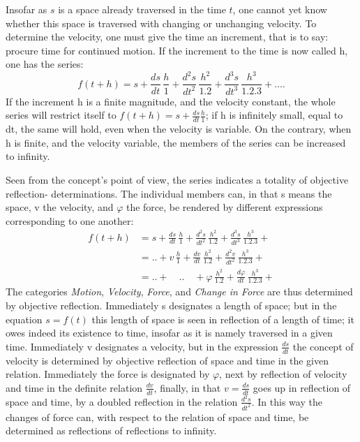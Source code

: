 \documentclass[12pt]{book}
\begin{document}
Insofar as $s$ is a space already traversed in the time $t$, one cannot yet know whether this space is
traversed with changing or unchanging velocity. To determine the velocity, one must give the time an
increment, that
is to say: procure time for continued motion. If the increment to the time is now called h, one has the
series:
\[ f(t+h) = s + \frac{ds}{dt}\,\frac{h}{1} + \frac{d^2 s}{dt^2}\,\frac{h^2}{1.2}
+ \frac{d^3 s}{dt^3}\,\frac{h^3}{1.2.3} + \ldots. \]
If the increment h is a finite magnitude, and the velocity constant, the whole series will restrict itself
to $f(t+h) = s + \frac{ds}{dt}\frac{h}{1}$; if h is infinitely small, equal to dt, the same will hold, even
when the velocity is variable. On the contrary, when h is finite, and the velocity variable, the members of
the series can be increased to infinity.

Seen from the concept's point of view, the series indicates a totality of objective reflection-
determinations. The individual members can, in that s means the space, v the velocity, and $\varphi$ the
force, be rendered by different expressions corresponding to one another:
\[ \begin{aligned}
f(t+h) &= s + \frac{ds}{dt}\,\frac{h}{1} + \frac{d^2 s}{dt^2}\,\frac{h^2}{1.2} +
\frac{d^3 s}{dt^3}\,\frac{h^3}{1.2.3} + \\
&= .. + v\,\frac{h}{1} + \frac{dv}{dt}\,\frac{h^2}{1.2} + \frac{d^2 v}{dt^2}\,\frac{h^3}{1.2.3} + \\
&= .. + \quad .. \quad + \varphi\,\frac{h^2}{1.2} + \frac{d\varphi}{dt}\,\frac{h^3}{1.2.3} +
\end{aligned} \]
The categories \emph{Motion}, \emph{Velocity}, \emph{Force}, and \emph{Change in Force} are thus
determined by objective reflection. Immediately s designates a length of space; but in the equation
$s = f(t)$ this length of space is seen in reflection of a length of time; it owes indeed its existence to
time, insofar as it is namely traversed in a given time. Immediately v designates a velocity, but in the
expression $\frac{ds}{dt}$ the concept of velocity is determined by objective reflection of space and time
in the given relation. Immediately the force is designated by $\varphi$, next by reflection of velocity and
time in the definite relation $\frac{dv}{dt}$, finally, in that $v = \frac{ds}{dt}$ goes up in reflection of
space and time, by a doubled reflection in the relation
$\frac{d^2 s}{dt^2}$. In this way the changes of force can, with respect to the relation of space and time,
be determined as reflections of reflections to infinity.
\end{document}
